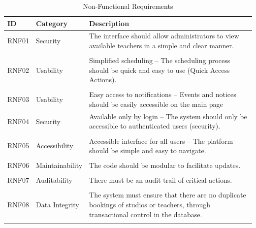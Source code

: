 \documentclass[12pt,a4paper]{report}
\begin{document}
\begin{table}[H]
\centering
\caption{Non-Functional Requirements}
\begin{tabularx}{\textwidth}{@{} l l X @{}}
\toprule
\textbf{ID} & \textbf{Category} & \textbf{Description} \\
\midrule
RNF01 & Security & The interface should allow administrators to view available teachers in a simple and clear manner. 
\\
\\
RNF02 & Usability & Simplified scheduling – The scheduling process should be quick and easy to use (Quick Access Actions).
\\
\\
RNF03 & Usability &  Easy access to notifications – Events and notices should be easily accessible on the main page 
\\
RNF04 & Security & Available only by login – The system should only be accessible to authenticated users (security). 
\\
\\
RNF05 & Accessibility & Accessible interface for all users – The platform should be simple and easy to navigate.
\\
\\
RNF06 &  Maintainability  & The code should be modular to facilitate updates. 
\\
\\

RNF07 & Auditability & There must be an audit trail of critical actions. 
\\
\\
RNF08 & Data Integrity & The system must ensure that there are no duplicate bookings of studios or teachers, through transactional control in the database.
\\
\\
\bottomrule
\end{tabularx}
\end{table}
\end{document}
